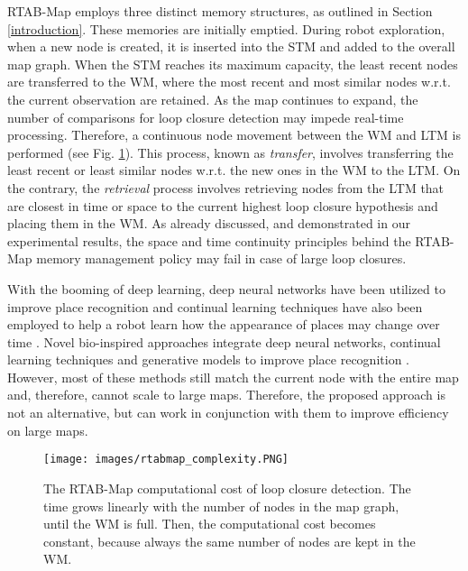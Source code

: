 \documentclass[letterpaper, 10 pt, conference]{ieeeconf}  %
\begin{document}
RTAB-Map employs three distinct memory structures, as outlined in Section \ref{introduction}. These memories are initially emptied. During robot exploration, when a new node is created, it is inserted into the STM and added to the overall map graph. When the STM reaches its maximum capacity, the least recent nodes are transferred to the WM, where the most recent and most similar nodes w.r.t. the current observation are retained. As the map continues to expand, the number of comparisons for loop closure detection may impede real-time processing. Therefore, a continuous node movement between the WM and LTM is performed (see Fig. \ref{fig:rtabmap}). This process, known as \textit{transfer}, involves transferring the least recent or least similar nodes w.r.t. the new ones in the WM to the LTM. On the contrary, the \textit{retrieval} process involves retrieving nodes from the LTM that are closest in time or space to the current highest loop closure hypothesis and placing them in the WM. As already discussed, and demonstrated in our experimental results, the space and time continuity principles behind the RTAB-Map memory management policy may fail in case of large loop closures.  

With the booming of deep learning, deep neural networks have been utilized to improve place recognition \cite{b8, b9} and continual learning techniques have also been employed to help a robot learn how the appearance of places may change over time \cite{b10}. Novel bio-inspired approaches integrate deep neural networks, continual learning techniques and generative models to improve place recognition \cite{b11}. However, most of these methods still match the current node with the entire map and, therefore, cannot scale to large maps. Therefore, the proposed approach is not an alternative, but can work in conjunction with them to improve efficiency on large maps.  

\begin{figure}[htbp]
    \centering
    \texttt{[image: images/rtabmap\_complexity.PNG]}
    \caption{The RTAB-Map computational cost of loop closure detection. The time grows linearly with the number of nodes in the map graph, until the WM is full. Then, the computational cost becomes constant, because always the same number of nodes are kept in the WM.}
    \label{fig:rtabmap}
\end{figure}
\end{document}
